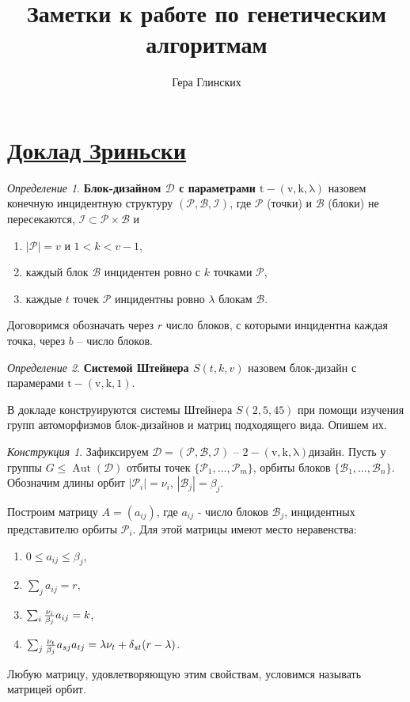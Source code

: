 \documentclass[a4,12pt]{article}
\author{Гера Глинских}
\title{Заметки к работе по генетическим алгоритмам}
\theoremstyle{remark}
\newtheorem{defi}{Определение}
\newtheorem{cons}{Конструкция}
\newcommand{\bdd}{\mathcal{D}}
\newcommand{\bdp}{\mathcal{P}}
\newcommand{\bdb}{\mathcal{B}}
\newcommand{\bdi}{\mathcal{I}}
\newcommand{\bd}[4]{\operatorname{#1-(#2,#3,#4)}}
\newcommand{\aut}[1]{\operatorname{Aut}(#1)}
\begin{document}
\maketitle{}

\section{\href{https://github.com/glinskikhg/combinatorics-summer/blob/f136271012f137d1f71936810deeffd4e36ccef6/docs/talk_zrinski-1.pdf}{Доклад Зриньски}}

\begin{defi}
\textbf{Блок-дизайном $\bdd$ с параметрами $\bd{t}{v}{k}{\lambda}$} назовем конечную инцидентную структуру $(\bdp,\bdb,\bdi)$, где $\bdp$ (точки) и $\bdb$ (блоки) не пересекаются, $\bdi \subset \bdp \times \bdb$ и
\begin{enumerate}
    \item $|\bdp| = v$ и $1 < k < v - 1$,
    \item каждый блок $\bdb$ инцидентен ровно с $k$ точками $\bdp$,
    \item каждые $t$ точек $\bdp$ инцидентны ровно $\lambda$ блокам $\bdb$.
\end{enumerate}
\end{defi}

Договоримся обозначать через $r$ число блоков, с которыми инцидентна каждая точка, через $b$ -- число блоков.

\begin{defi}
\textbf{Системой Штейнера $S(t,k,v)$} назовем блок-дизайн с парамерами $\bd{t}{v}{k}{1}$.
\end{defi}

В докладе конструируются системы Штейнера $S(2,5,45)$ при помощи изучения групп автоморфизмов блок-дизайнов и матриц подходящего вида. Опишем их.

\begin{cons}
Зафиксируем $\bdd = (\bdp,\bdb,\bdi)$ -- $\operatorname{2-(v,k,\lambda)} дизайн$. Пусть у группы $G \le \aut{\bdd}$ отбиты точек $\{\bdp_1,\ldots,\bdp_m\}$, орбиты блоков $\{\bdb_1,\ldots,\bdb_n\}$. Обозначим длины орбит $|\bdp_i| = \nu_i$, $|\bdb_j| = \beta_j$.

Построим матрицу $A = (a_{ij})$, где $a_{ij}$ - число блоков $\bdb_j$, инцидентных представителю орбиты $\bdp_i$. Для этой матрицы имеют место неравенства:
\begin{enumerate}
\item $0 \le a_{ij} \le \beta_j$,
\item $\sum_j a_{ij} = r$,
\item $\sum_i {\nu_i \over \beta_j} a_{ij} = k$,
\item $\sum_j {\nu_t \over \beta_j} a_{sj} a_{tj} = \lambda \nu_t + \delta_{st}(r-\lambda)$.
\end{enumerate}

Любую матрицу, удовлетворяющую этим свойствам, условимся называть матрицей орбит.
\end{cons}
\end{document}
